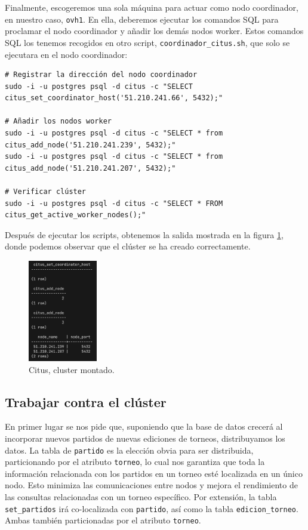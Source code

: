 Finalmente, escogeremos una sola máquina para actuar como nodo coordinador, en nuestro caso, \texttt{ovh1}. En ella, deberemos ejecutar los comandos SQL para proclamar el nodo coordinador y añadir los demás nodos worker. Estos comandos SQL los tenemos recogidos en otro script, \texttt{coordinador\_citus.sh}, que solo se ejecutara en el nodo coordinador:

\begin{verbatim}
# Registrar la dirección del nodo coordinador
sudo -i -u postgres psql -d citus -c "SELECT citus_set_coordinator_host('51.210.241.66', 5432);"

# Añadir los nodos worker
sudo -i -u postgres psql -d citus -c "SELECT * from citus_add_node('51.210.241.239', 5432);"
sudo -i -u postgres psql -d citus -c "SELECT * from citus_add_node('51.210.241.207', 5432);"

# Verificar clúster
sudo -i -u postgres psql -d citus -c "SELECT * FROM citus_get_active_worker_nodes();"
\end{verbatim}

Después de ejecutar los scripts, obtenemos la salida mostrada en la figura \ref{fig:citus_cluster}, donde podemos observar que el clúster se ha creado correctamente.

\begin{figure}[H]
\centering
\includegraphics[width=0.27\textwidth]{fotos/citus/terraform.png}
\caption{Citus, cluster montado.}
\label{fig:citus_cluster}
\end{figure}


\subsection*{Trabajar contra el clúster}

En primer lugar se nos pide que, suponiendo que la base de datos crecerá al incorporar nuevos partidos de nuevas ediciones de torneos, distribuyamos los datos. La tabla de \texttt{partido} es la elección obvia para ser distribuida, particionando por el atributo \texttt{torneo}, lo cual nos garantiza que toda la información relacionada con los partidos en un torneo esté localizada en un único nodo. Esto minimiza las comunicaciones entre nodos y mejora el rendimiento de las consultas relacionadas con un torneo específico. Por extensión, la tabla \texttt{set\_partidos} irá co-localizada con \texttt{partido}, así como la tabla \texttt{edicion\_torneo}. Ambas también particionadas por el atributo \texttt{torneo}. \\

